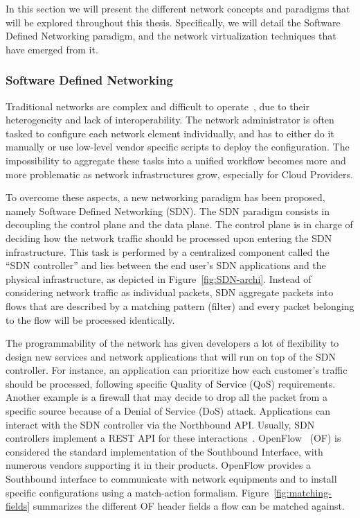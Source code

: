 In this section we will present the different network concepts and paradigms that will be explored throughout this thesis.
Specifically, we will detail the Software Defined Networking paradigm, and the network virtualization techniques that have emerged from it.

\subsubsection{Software Defined Networking}

Traditional networks are complex and difficult to operate~\cite{complexnetworks}, due to their heterogeneity and lack of interoperability. The network administrator is often tasked to configure each network element individually, and has to either do it manually or use low-level vendor specific scripts to deploy the configuration. The impossibility to aggregate these tasks into a unified workflow becomes more and more problematic as network infrastructures grow, especially for Cloud Providers.

To overcome these aspects, a new networking paradigm has been proposed, namely Software Defined Networking (SDN).
The SDN paradigm consists in decoupling the control plane and the data plane.
The control plane is in charge of deciding how the network traffic should be processed upon entering the SDN infrastructure.
This task is performed by a centralized component called the ``SDN controller'' and lies between the end user's SDN applications and the physical infrastructure, as depicted in Figure~\ref{fig:SDN-archi}. Instead of considering network traffic as individual packets, SDN aggregate packets into flows that are described by a matching pattern (filter) and every packet belonging to the flow will be processed identically. 



The programmability of the network has given developers a lot of flexibility to design new services and network applications that will run on top of the SDN controller.
For instance, an application can prioritize how each customer's traffic should be processed, following specific Quality of Service (QoS) requirements.
Another example is a firewall that may decide to drop all the packet from a specific source because of a Denial of Service (DoS) attack.
Applications can interact with the SDN controller via the Northbound API.
Usually, SDN controllers implement a REST API for these interactions~\cite{onos-Berde2014a,opendaylight,floodlight}.
OpenFlow~\cite{Openflow-McKeown2008} (OF) is considered the standard implementation of the Southbound Interface, with numerous vendors supporting it in their products.
OpenFlow provides a Southbound interface to communicate with network equipments and to install specific configurations using a match-action formalism.
Figure~\ref{fig:matching-fields} summarizes the different OF header fields a flow can be matched against.

